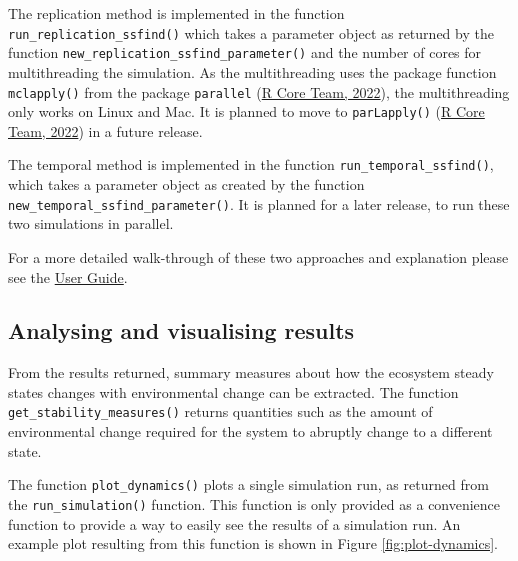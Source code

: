 \documentclass[
]{article}
\begin{document}
The replication method is implemented in the function \texttt{run\_replication\_ssfind()} which takes a parameter object as returned by the function \texttt{new\_replication\_ssfind\_parameter()} and the number of cores for multithreading the simulation. As the multithreading uses the package function \texttt{mclapply()} from the package \texttt{parallel} (\protect\hyperlink{ref-RCoreTeam2022}{R Core Team, 2022}), the multithreading only works on Linux and Mac. It is planned to move to \texttt{parLapply()} (\protect\hyperlink{ref-RCoreTeam2022}{R Core Team, 2022}) in a future release.

The temporal method is implemented in the function \texttt{run\_temporal\_ssfind()}, which takes a parameter object as created by the function \texttt{new\_temporal\_ssfind\_parameter()}. It is planned for a later release, to run these two simulations in parallel.

For a more detailed walk-through of these two approaches and explanation please see the \href{https://uzh-peg.r-universe.dev/articles/microxanox/User-guide.html}{User Guide}.

\hypertarget{analysing-and-visualising-results}{%
\subsection{Analysing and visualising results}\label{analysing-and-visualising-results}}

From the results returned, summary measures about how the ecosystem steady states changes with environmental change can be extracted. The function \texttt{get\_stability\_measures()} returns quantities such as the amount of environmental change required for the system to abruptly change to a different state.

The function \texttt{plot\_dynamics()} plots a single simulation run, as returned from the \texttt{run\_simulation()} function. This function is only provided as a convenience function to provide a way to easily see the results of a simulation run. An example plot resulting from this function is shown in Figure \ref{fig:plot-dynamics}.
\end{document}
